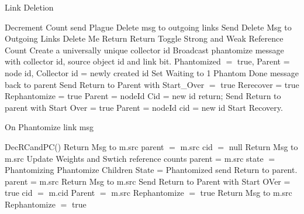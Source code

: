 \documentclass{article}
\begin{document}
\begin{algorithm}
\caption{Link Deletion}
\label{Link Deletion}
\begin{algorithmic}[1]
\State Decrement Count
		\State send Plague Delete msg to outgoing links
	\EndIf
		\State Send Delete Msg to Outgoing Links
		\State Delete Me
		\State Return
		\State Return
		\State Toggle Strong and Weak Reference Count
		\State Create a universally unique collector id
			\State Broadcast phantomize message with collector id, source object id and link bit.
		\EndFor
		\State Phantomized $=$ true, Parent = node id, Collector id = newly created id
			\State Set Waiting to 1
		\State Phantom Done message back to parent
		\EndIf
	\Else
				\State Send Return to Parent with Start\_Over $=$ true
			\EndIf
			\State Rerecover = true
			\State Rephantomize = true
			\State Parent = nodeId
			\State Cid = new id
		\Else
				\State return;
			\EndIf
				\State Send Return to parent with Start Over = true
			\EndIf
			\State Parent = nodeId
			\State cid = new id
			\State Start Recovery.
		\EndIf
	\EndIf
\EndProcedure
\end{algorithmic}
\end{algorithm}	

\begin{algorithm}
\caption{On Phantomize link msg}
\label{Phantom message received}
\begin{algorithmic}[1]
\State DecRCandPC()
			\State Return Msg to m.src
		\Else
			\State parent $=$ m.src
			\State cid $=$ null
		\EndIf
	\Else
			\State Return Msg to m.src
			\State Update Weights and Swtich reference counts
			\State parent = m.src
			\State state $=$ Phantomizing
			\State Phantomize Children
				\State State = Phantomized
				\State send Return to parent.
			\EndIf
		\Else
			\State parent = m.src
			\State Return Msg to m.src
			\EndIf
	\EndIf
{}
			\State Send Return to Parent with Start OVer = true
		\EndIf
		\State cid $=$ m.cid
		\State Parent $=$ m.src
		\State Rephantomize $=$ true
	\Else 
			\State Return Msg  to m.src
				\State Rephantomize $=$ true	
			\EndIf
	\EndIf
\EndIf
\EndProcedure
\end{algorithmic}
\end{algorithm}	
	
\end{document}
